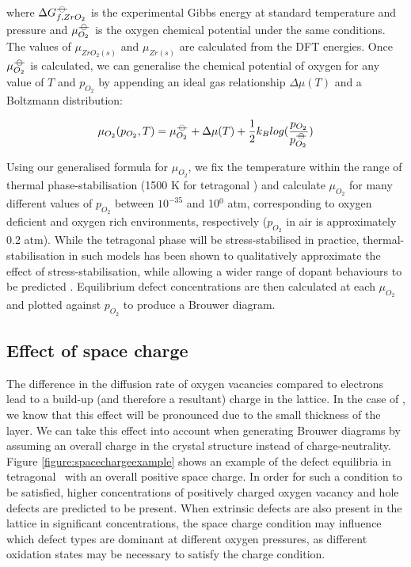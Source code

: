 where $\Delta{G^{{\ensuremath{-\kern-4pt{\ominus}\kern-4pt-}}}_{f, ZrO_2}}$ is the experimental Gibbs energy at standard temperature and pressure and $\mu^{{-\kern-4pt{\ominus}\kern-4pt-}}_{O_2}$ is the oxygen chemical potential under the same conditions. The values of $\mu_{ZrO_2(s)}$ and $\mu_{Zr(s)}$ are calculated from the DFT energies. Once $\mu^{{-\kern-4pt{\ominus}\kern-4pt-}}_{O_2}$ is calculated, we can generalise the chemical potential of oxygen for any value of $T$ and $p_{O_2}$ by appending an ideal gas relationship $\Delta{\mu(T)}$ and a Boltzmann distribution:

\begin{equation}
\mu_{O_2}(p_{O_2},T) = \mu^{{-\kern-4pt{\ominus}\kern-4pt-}}_{O_2} + \Delta{\mu(T)} + \frac{1}{2}{k_B}log(\frac{p_{O_2}}{p^{{-\kern-4pt{\ominus}\kern-4pt-}}_{O_2}})
\end{equation}

Using our generalised formula for $\mu_{O_2}$, we fix the temperature within the range of thermal phase-stabilisation (1500 K for tetragonal \zirconia) and calculate $\mu_{O_2}$ for many different values of $p_{O_2}$ between $10^{-35}$ and 10$^{0}$ atm, corresponding to oxygen deficient and oxygen rich environments, respectively ($p_{O_2}$ in air is approximately 0.2 atm). While the tetragonal phase will be stress-stabilised in practice, thermal-stabilisation in such models has been shown to qualitatively approximate the effect of stress-stabilisation, while allowing a wider range of dopant behaviours to be predicted \cite{Bell2016}. Equilibrium defect concentrations are then calculated at each $\mu_{O_2}$ and plotted against $p_{O_2}$ to produce a Brouwer diagram. 

\subsection{Effect of space charge}

The difference in the diffusion rate of oxygen vacancies compared to electrons lead to a build-up (and therefore a resultant) charge in the lattice. In the case of \zirconia , we know that this effect will be pronounced due to the small thickness of the layer. We can take this effect into account when generating Brouwer diagrams by assuming an overall charge in the crystal structure instead of charge-neutrality. Figure \ref{figure:spacechargeexample} shows an example of the defect equilibria in tetragonal \zirconia\ with an overall positive space charge. In order for such a condition to be satisfied, higher concentrations of positively charged oxygen vacancy and hole defects are predicted to be present. When extrinsic defects are also present in the lattice in significant concentrations, the space charge condition may influence which defect types are dominant at different oxygen pressures, as different oxidation states may be necessary to satisfy the charge condition.

